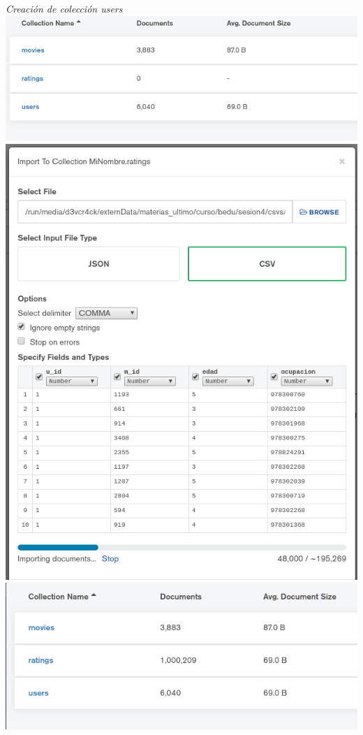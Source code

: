 \documentclass[10pt]{article}
\begin{document}
\begin{center}
  \textit{Creación de colección users}\\
  \includegraphics[scale=0.25]{imgs/11.png}\\
  \includegraphics[scale=0.25]{imgs/12.png}\\
  \includegraphics[scale=0.25]{imgs/13.png}\\

\end{center}
\end{document}
